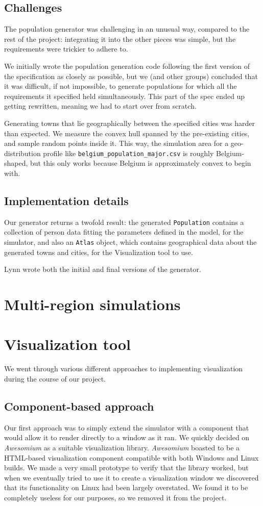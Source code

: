 \documentclass[a4paper,12pt]{article}
\begin{document}
\subsection{Challenges}
The population generator was challenging in an unusual way, compared to the rest of the project: integrating it into the other pieces was simple, but the requirements were trickier to adhere to.

We initially wrote the population generation code following the first version of the specification as closely as possible, but we (and other groups) concluded that it was difficult, if not impossible, to generate populations for which all the requirements it specified held simultaneously. This part of the spec ended up getting rewritten, meaning we had to start over from scratch.

Generating towns that lie geographically between the specified cities was harder than expected. We measure the convex hull spanned by the pre-existing cities, and sample random points inside it. This way, the simulation area for a geo-distribution profile like \texttt{belgium\_population\_major.csv} is roughly Belgium-shaped, but this only works because Belgium is approximately convex to begin with.

\subsection{Implementation details}
Our generator returns a twofold result: the generated \texttt{Population} contains a collection of person data fitting the parameters defined in the model, for the simulator, and also an \texttt{Atlas} object, which contains geographical data about the generated towns and cities, for the Visualization tool to use.

Lynn wrote both the initial and final versions of the generator.

\section{Multi-region simulations}

\section{Visualization tool}
We went through various different approaches to implementing visualization during the course of our project.

\subsection{Component-based approach}
Our first approach was to simply extend the simulator with a component that would allow it to render directly to a window as it ran. We quickly decided on \textit{Awesomium} as a suitable visualization library. \textit{Awesomium} boasted to be a HTML-based visualization component compatible with both Windows and Linux builds. We made a very small prototype to verify that the library worked, but when we eventually tried to use it to create a visualization window we discovered that its functionality on Linux had been largely overstated. We found it to be completely useless for our purposes, so we removed it from the project.
\end{document}
